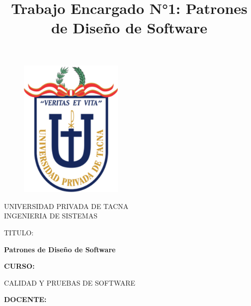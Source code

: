 \documentclass{article}
\begin{document}
\title{Trabajo Encargado N°1: Patrones de Diseño de Software}

\begin{titlepage}
\begin{figure}[htb]
\begin{center}
\includegraphics[width=5cm]{logo.png}
\end{center}
\end{figure}
\vspace*{-0.25in}
\begin{center}
\large{UNIVERSIDAD PRIVADA DE TACNA}\\
\vspace*{-0.025in}
INGENIERIA DE SISTEMAS  \\

\vspace*{0.5in}
\begin{large}
TITULO:\\
\end{large}

\vspace*{0.1in}
\begin{Large}
\textbf{Patrones de Diseño de Software} \\
\end{Large}

\vspace*{0.3in}
\begin{Large}
\textbf{CURSO:} \\
\end{Large}

\vspace*{0.1in}
\begin{large}
CALIDAD Y PRUEBAS DE SOFTWARE\\
\end{large}

\vspace*{0.3in}
\begin{Large}
\textbf{DOCENTE:} \\
\end{Large}


\end{center}
\end{titlepage}
\end{document}
